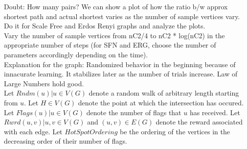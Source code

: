 \documentclass{article}
\begin{document}
Doubt: How many pairs? We can show a plot of how the ratio b/w approx shortest path and actual shortest varies as the number of sample vertices vary. Do it for Scale Free and Erdos Renyi graphs and analyze the plots.\\
Vary the number of sample vertices from nC2/4 to nC2 * log(nC2) in the appropriate number of steps (for SFN and ERG, choose the number of parameters accordingly depending on the time).\\
Explanation for the graph: Randomized behavior in the beginning because of innacurate learning. It stabilizes later as the number of trials increase. Law of Large Numbers hold good.\\

Let $Rndm(u) | u \in V(G)$ denote a random walk of arbitrary length starting from $u$. Let $H \in V(G)$ denote the point at which the intersection has occured. Let $Flags(u)| u \in V(G)$ denote the number of flags that $u$ has received. Let $Rwrd(u,v) | u,v \in V(G)$ and $(u,v) \in E(G)$ denote the reward associated with each edge. Let $HotSpotOrdering$ be the ordering of the vertices in the decreasing order of their number of flags.\\
\end{document}
